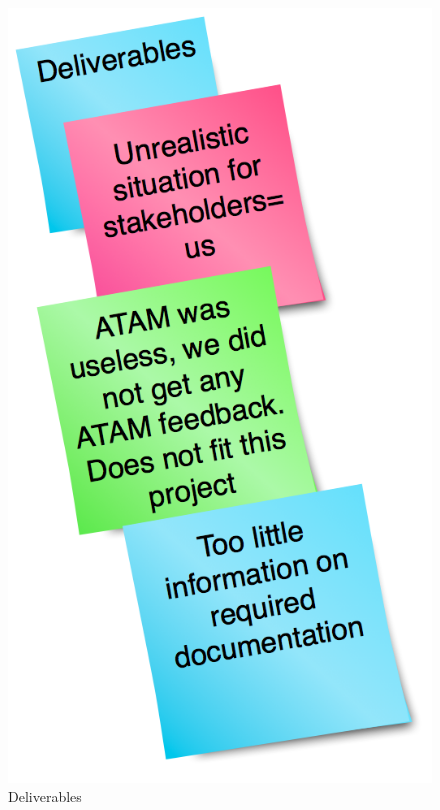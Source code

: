 \documentclass[titlepage,a4paper,11pt]{article}
\begin{document}
\begin{figure}[ht]
    \begin{minipage}[b]{0.5\linewidth}
        \centering
        \includegraphics[scale=0.4]{graphics/postit/NEG_deliverables}
        \caption{Deliverables}
        \label{fig:neg1}
    \end{minipage}
    \hspace{0.5cm}
    \begin{minipage}[b]{0.5\linewidth}

\end{minipage}
\end{figure}
\end{document}
